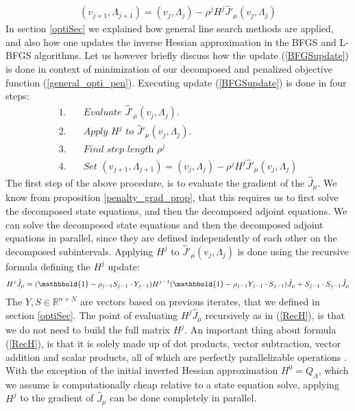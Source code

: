 \begin{align}
(v_{j+1},\Lambda_{j+1}) = (v_j,\Lambda_j) - \rho^j H^j \hat J'_{\mu}(v_j,\Lambda_j) \label{BFGSupdate}
\end{align}
In section \ref{optiSec} we explained how general line search methods are applied, and also how one updates the inverse Hessian approximation in the BFGS and L-BFGS algorithms. Let us however briefly discuss how the update (\ref{BFGSupdate}) is done in context of minimization of our decomposed and penalized objective function (\ref{general_opti_pen}). Executing update (\ref{BFGSupdate}) is done in four steps:
\begin{align*}
1.\quad&\textit{Evaluate $\hat J'_{\mu}(v_j,\Lambda_j)$.} \\
2.\quad&\textit{Apply $H^j$ to $\hat J'_{\mu}(v_j,\Lambda_j)$.}\\
3.\quad&\textit{Find step length $\rho^j$} \\
4.\quad&\textit{Set $(v_{j+1},\Lambda_{j+1}) = (v_j,\Lambda_j) - \rho^j H^j \hat J'_{\mu}(v_j,\Lambda_j)$} 
\end{align*}
The first step of the above procedure, is to evaluate the gradient of the $\hat J_{\mu}$. We know from proposition \ref{penalty_grad_prop}, that this requires us to first solve the decomposed state equations, and then the decomposed adjoint equations. We can solve the decomposed state equations and then the decomposed adjoint equations in parallel, since they are defined independently of each other on the decomposed subintervals. Applying $H^j$ to $\hat J'_{\mu}(v_j,\Lambda_j)$ is done using the recursive formula defining the $H^j$ update:
\begin{align}
H^j \hat J_{\mu} = (\mathbbold{1}-\rho_{j-1}S_{j-1}\cdot Y_{j-1})H^{j-1}(\mathbbold{1} -\rho_{j-1}Y_{j-1}\cdot S_{j-1})\hat J_{\mu} + S_{j-1}\cdot S_{j-1}\hat J_{\mu} \label{RecH}
\end{align}
The $Y,S\in\mathbb{R}^{n+N}$ are vectors based on previous iterates, that we defined in section \ref{optiSec}. The point of evaluating $H^j \hat J_{\mu}$ recursively as in (\ref{RecH}), is that we do not need to build the full matrix $H^j$. An important thing about formula (\ref{RecH}), is that it is solely made up of dot products, vector subtraction, vector addition and scalar products, all of which are perfectly parallelizable operations \cite{grama2003introduction}. With the exception of the initial inverted Hessian approximation $H^0=Q_{\Lambda}$, which we assume is computationally cheap relative to a state equation solve, applying $H^j$ to the gradient of $\hat J_{\mu}$ can be done completely in parallel. 
